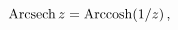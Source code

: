 \[\mathop{\mathrm{Arcsech}\/}\nolimits z=\mathop{\mathrm{Arccosh}\/}\nolimits\!%
\left(1/z\right),\]